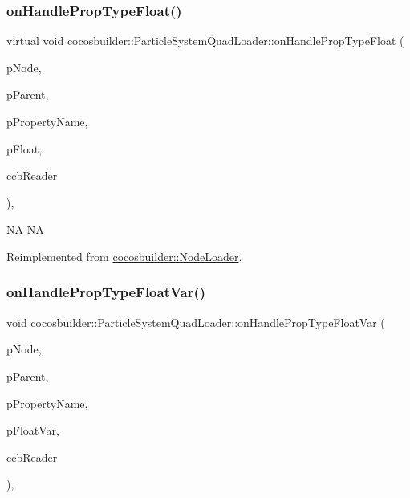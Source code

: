 \subsubsection{\texorpdfstring{on\+Handle\+Prop\+Type\+Float()}{onHandlePropTypeFloat()}\hspace{0.1cm}{\footnotesize\ttfamily [2/2]}}
{\footnotesize\ttfamily virtual void cocosbuilder\+::\+Particle\+System\+Quad\+Loader\+::on\+Handle\+Prop\+Type\+Float (\begin{DoxyParamCaption}\item[{cocos2d\+::\+Node $\ast$}]{p\+Node,  }\item[{cocos2d\+::\+Node $\ast$}]{p\+Parent,  }\item[{const char $\ast$}]{p\+Property\+Name,  }\item[{float}]{p\+Float,  }\item[{\hyperlink{classcocosbuilder_1_1CCBReader}{C\+C\+B\+Reader} $\ast$}]{ccb\+Reader }\end{DoxyParamCaption})\hspace{0.3cm}{\ttfamily [protected]}, {\ttfamily [virtual]}}

NA  NA 

Reimplemented from \hyperlink{classcocosbuilder_1_1NodeLoader}{cocosbuilder\+::\+Node\+Loader}.

\mbox{\label{classcocosbuilder_1_1ParticleSystemQuadLoader_a08d967bb732e2824782f26e3142a7183}} 
\subsubsection{\texorpdfstring{on\+Handle\+Prop\+Type\+Float\+Var()}{onHandlePropTypeFloatVar()}\hspace{0.1cm}{\footnotesize\ttfamily [1/2]}}
{\footnotesize\ttfamily void cocosbuilder\+::\+Particle\+System\+Quad\+Loader\+::on\+Handle\+Prop\+Type\+Float\+Var (\begin{DoxyParamCaption}\item[{cocos2d\+::\+Node $\ast$}]{p\+Node,  }\item[{cocos2d\+::\+Node $\ast$}]{p\+Parent,  }\item[{const char $\ast$}]{p\+Property\+Name,  }\item[{float $\ast$}]{p\+Float\+Var,  }\item[{\hyperlink{classcocosbuilder_1_1CCBReader}{C\+C\+B\+Reader} $\ast$}]{ccb\+Reader }\end{DoxyParamCaption})\hspace{0.3cm}{\ttfamily [protected]}, {\ttfamily [virtual]}}

